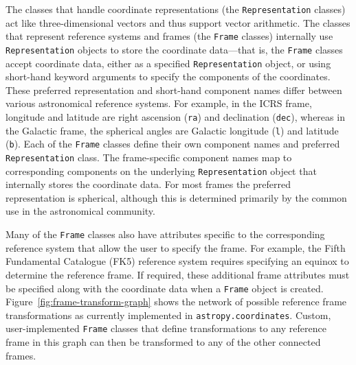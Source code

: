 \documentclass[modern]{aastex61}
\renewcommand{\figurename}{Figure\xspace}
\begin{document}
The classes that handle coordinate representations (the \texttt{Representation}
classes) act like three-dimensional vectors and thus support vector arithmetic.
The classes that represent reference systems and frames (the \texttt{Frame}
classes) internally use \texttt{Representation} objects to store the coordinate
data---that is, the \texttt{Frame} classes accept coordinate data, either as a
specified \texttt{Representation} object, or using short-hand keyword arguments
to specify the components of the coordinates.
These preferred representation and short-hand component names differ between
various astronomical reference systems.
For example, in the ICRS frame, longitude and latitude are right ascension
(\texttt{ra}) and declination (\texttt{dec}), whereas in the Galactic frame, the
spherical angles are Galactic longitude (\texttt{l}) and latitude (\texttt{b}).
Each of the \texttt{Frame} classes define their own component names and
preferred \texttt{Representation} class.
The frame-specific component names map to corresponding components on the
underlying \texttt{Representation} object that internally stores the coordinate
data.
For most frames the preferred representation is spherical, although this is
determined primarily by the common use in the astronomical community.

Many of the \texttt{Frame} classes also have attributes specific to the
corresponding reference system that allow the user to specify the frame.
For example, the Fifth Fundamental Catalogue (FK5) reference system requires
specifying an equinox to determine the reference frame.
If required, these additional frame attributes must be specified along with the
coordinate data when a \texttt{Frame} object is created.
\figurename~\ref{fig:frame-transform-graph} shows the network of possible
reference frame transformations as currently implemented in
\texttt{astropy.coordinates}.
Custom, user-implemented \texttt{Frame} classes that define transformations to
any reference frame in this graph can then be transformed to any of the other
connected frames.
\end{document}
